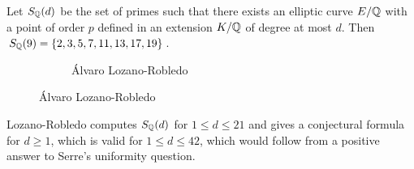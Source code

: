 \begin{frame}[plain]
\begin{thm}
Let $S_{\mathbb{Q}}(d)$ be the set of primes such that there exists an elliptic curve $E/\mathbb{Q}$ with a point of order $p$ defined in an extension $K/\mathbb{Q}$ of degree at most $d$. Then $S_{\mathbb{Q}}(9)= \{ 2, 3, 5, 7, 11, 13, 17, 19 \}$.
\end{thm}
	\begin{figure}[h]
	\centering
	\begin{subfigure}{\textwidth}
	\captionsetup{labelformat=empty}
	\centering
	\caption{\'Alvaro Lozano-Robledo}
	\end{subfigure}
	\end{figure}

\begin{rem}
Lozano-Robledo computes $S_{\mathbb{Q}}(d)$ for $1 \leq d \leq 21$ and gives a conjectural formula for $d \geq 1$, which is valid for $1 \leq d \leq 42$, which would follow from a positive answer to Serre's uniformity question. 
\end{rem}
\end{frame}



